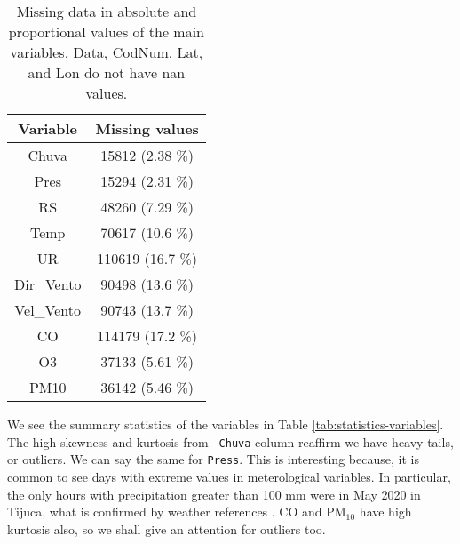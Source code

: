 \begin{table}
    \centering
    \begin{tabular}{|c|c|}
        \hline
        {\bf Variable} & {\bf Missing values} \\\hline
        Chuva     &   15812 (2.38 \%) \\\hline
        Pres      &   15294 (2.31 \%) \\\hline
        RS        &   48260 (7.29 \%) \\\hline
        Temp      &   70617 (10.6 \%) \\\hline
        UR        &  110619 (16.7 \%) \\\hline
        Dir\_Vento &   90498 (13.6 \%) \\\hline
        Vel\_Vento &   90743 (13.7 \%) \\\hline
        CO        &  114179 (17.2 \%) \\\hline
        O3        &   37133 (5.61 \%) \\\hline
        PM10      &   36142 (5.46 \%) \\\hline
    \end{tabular}
    \caption{Missing data in absolute and proportional values of the main variables. Data, CodNum, Lat, and Lon do not have nan values.}
    \label{tab:missing-values}    
\end{table}

We see the summary statistics of the variables in Table
\ref{tab:statistics-variables}. The high skewness and kurtosis from {\tt
Chuva} column reaffirm we have heavy tails, or outliers. We can say the same
for {\tt Press}. This is interesting because, it is common to see days with
extreme values in meterological variables. In particular, the only hours with
precipitation greater than 100 mm were in May 2020 in Tijuca, what is
confirmed by weather references \cite{climatempo}. CO and PM$_{10}$ have high
kurtosis also, so we shall give an attention for outliers too. 

